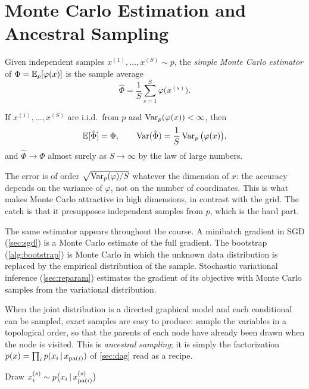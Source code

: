 \section{Monte Carlo Estimation and Ancestral Sampling}\label{sec:mc-estimation}

Given independent samples $x^{(1)},\dots,x^{(S)}\sim p$, the \emph{simple Monte Carlo estimator} of $\Phi=\mathbb{E}_p[\varphi(x)]$ is the sample average
\[
\hat\Phi=\frac1S\sum_{s=1}^S\varphi\big(x^{(s)}\big).
\]

\begin{proposition}\label{prop:simple-mc}
If $x^{(1)},\dots,x^{(S)}$ are i.i.d.\ from $p$ and $\operatorname{Var}_p(\varphi(x))<\infty$, then
\[
\mathbb{E}[\hat\Phi]=\Phi,\qquad\operatorname{Var}(\hat\Phi)=\frac1S\operatorname{Var}_p\big(\varphi(x)\big),
\]
and $\hat\Phi\to\Phi$ almost surely as $S\to\infty$ by the law of large numbers.
\end{proposition}

The error is of order $\sqrt{\operatorname{Var}_p(\varphi)/S}$ whatever the dimension of $x$: the accuracy depends on the variance of $\varphi$, not on the number of coordinates. This is what makes Monte Carlo attractive in high dimensions, in contrast with the grid. The catch is that it presupposes independent samples from $p$, which is the hard part.

\begin{remark}
The same estimator appears throughout the course. A minibatch gradient in SGD (\cref{sec:sgd}) is a Monte Carlo estimate of the full gradient. The bootstrap (\cref{alg:bootstrap}) is Monte Carlo in which the unknown data distribution is replaced by the empirical distribution of the sample. Stochastic variational inference (\cref{sec:reparam}) estimates the gradient of its objective with Monte Carlo samples from the variational distribution.
\end{remark}

When the joint distribution is a directed graphical model and each conditional can be sampled, exact samples are easy to produce: sample the variables in a topological order, so that the parents of each node have already been drawn when the node is visited. This is \emph{ancestral sampling}; it is simply the factorization $p(x)=\prod_ip(x_i\,|\, x_{\mathrm{pa}(i)})$ of \cref{sec:dag} read as a recipe.

\begin{algorithm}[H]
\caption{Ancestral Sampling}\label{alg:ancestral}
\begin{algorithmic}[1]
    \State Draw $x_i^{(s)}\sim p\big(x_i\,|\, x^{(s)}_{\mathrm{pa}(i)}\big)$ 
  \EndFor
\EndFor
{}
\end{algorithmic}
\end{algorithm}

